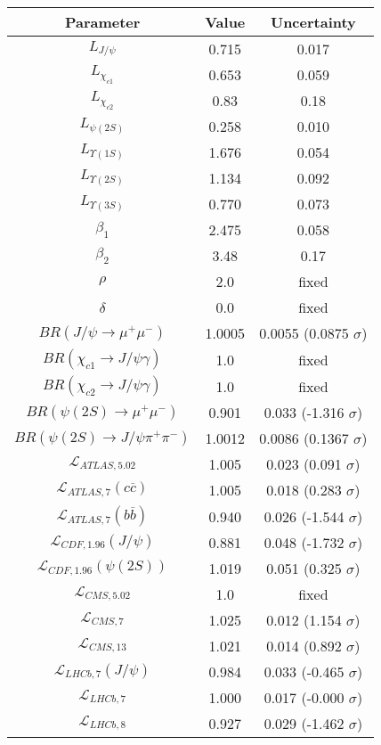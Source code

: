 \begin{table}[h!]
\centering
\begin{tabular}{c|c|c}
Parameter & Value & Uncertainty \\
\hline
$L_{J/\psi}$ & 0.715 & 0.017 \\
$L_{\chi_{c1}}$ & 0.653 & 0.059 \\
$L_{\chi_{c2}}$ & 0.83 & 0.18 \\
$L_{\psi(2S)}$ & 0.258 & 0.010 \\
$L_{\Upsilon(1S)}$ & 1.676 & 0.054 \\
$L_{\Upsilon(2S)}$ & 1.134 & 0.092 \\
$L_{\Upsilon(3S)}$ & 0.770 & 0.073 \\
$\beta_1$ & 2.475 & 0.058 \\
$\beta_2$ & 3.48 & 0.17 \\
$\rho$ & 2.0 & fixed \\
$\delta$ & 0.0 & fixed \\
$BR(J/\psi\rightarrow\mu^+\mu^-)$ & 1.0005 & 0.0055 (0.0875 $\sigma$) \\
$BR(\chi_{c1}\rightarrow J/\psi\gamma)$ & 1.0 & fixed \\
$BR(\chi_{c2}\rightarrow J/\psi\gamma)$ & 1.0 & fixed \\
$BR(\psi(2S)\rightarrow\mu^+\mu^-)$ & 0.901 & 0.033 (-1.316 $\sigma$) \\
$BR(\psi(2S)\rightarrow J/\psi\pi^+\pi^-)$ & 1.0012 & 0.0086 (0.1367 $\sigma$) \\
$\mathcal L_{ATLAS,5.02}$ & 1.005 & 0.023 (0.091 $\sigma$) \\
$\mathcal L_{ATLAS,7}(c\overline c)$ & 1.005 & 0.018 (0.283 $\sigma$) \\
$\mathcal L_{ATLAS,7}(b\overline b)$ & 0.940 & 0.026 (-1.544 $\sigma$) \\
$\mathcal L_{CDF,1.96}(J/\psi)$ & 0.881 & 0.048 (-1.732 $\sigma$) \\
$\mathcal L_{CDF,1.96}(\psi(2S))$ & 1.019 & 0.051 (0.325 $\sigma$) \\
$\mathcal L_{CMS,5.02}$ & 1.0 & fixed \\
$\mathcal L_{CMS,7}$ & 1.025 & 0.012 (1.154 $\sigma$) \\
$\mathcal L_{CMS,13}$ & 1.021 & 0.014 (0.892 $\sigma$) \\
$\mathcal L_{LHCb,7}(J/\psi)$ & 0.984 & 0.033 (-0.465 $\sigma$) \\
$\mathcal L_{LHCb,7}$ & 1.000 & 0.017 (-0.000 $\sigma$) \\
$\mathcal L_{LHCb,8}$ & 0.927 & 0.029 (-1.462 $\sigma$) \\

\end{tabular}
\end{table}
